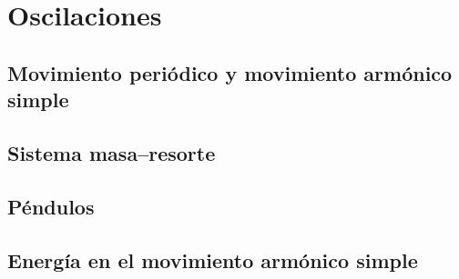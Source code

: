 ﻿\documentclass[11pt,letterpaper,openany]{book}
\begin{document}
\setcounter{part}{8}
\part{Oscilaciones}

\setcounter{chapter}{53}
\chapter{Movimiento periódico y movimiento armónico simple}



\chapter{Sistema masa–resorte}


\chapter{Péndulos}


\chapter{Energía en el movimiento armónico simple}

\end{document}
